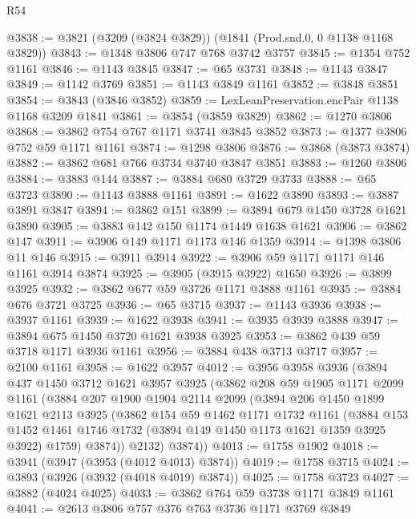\begin{lexlean}{R54}
\begin{coremodule}
@3838 := @3821 (@3209 (@3824 @3829)) (@1841 (Prod.snd.{0, 0} @1138 @1168 @3829))
@3843 := @1348 @3806 @747 @768 @3742 @3757
@3845 := @1354 @752 @1161
@3846 := @1143 @3845
@3847 := @65 @3731
@3848 := @1143 @3847
@3849 := @1142 @3769
@3851 := @1143 @3849 @1161
@3852 := @3848 @3851
@3854 := @3843 (@3846 @3852)
@3859 := LexLeanPreservation.encPair @1138 @1168 @3209 @1841
@3861 := @3854 (@3859 @3829)
@3862 := @1270 @3806
@3868 := @3862 @754 @767 @1171 @3741 @3845 @3852
@3873 := @1377 @3806 @752 @59 @1171 @1161
@3874 := @1298 @3806
@3876 := @3868 (@3873 @3874)
@3882 := @3862 @681 @766 @3734 @3740 @3847 @3851
@3883 := @1260 @3806
@3884 := @3883 @144
@3887 := @3884 @680 @3729 @3733
@3888 := @65 @3723
@3890 := @1143 @3888 @1161
@3891 := @1622 @3890
@3893 := @3887 @3891 @3847
@3894 := @3862 @151
@3899 := @3894 @679 @1450 @3728 @1621 @3890
@3905 := @3883 @142 @150 @1174 @1449 @1638 @1621
@3906 := @3862 @147
@3911 := @3906 @149 @1171 @1173 @146 @1359
@3914 := @1398 @3806 @11 @146
@3915 := @3911 @3914
@3922 := @3906 @59 @1171 @1171 @146 @1161 @3914 @3874
@3925 := @3905 (@3915 @3922) @1650
@3926 := @3899 @3925
@3932 := @3862 @677 @59 @3726 @1171 @3888 @1161
@3935 := @3884 @676 @3721 @3725
@3936 := @65 @3715
@3937 := @1143 @3936
@3938 := @3937 @1161
@3939 := @1622 @3938
@3941 := @3935 @3939 @3888
@3947 := @3894 @675 @1450 @3720 @1621 @3938 @3925
@3953 := @3862 @439 @59 @3718 @1171 @3936 @1161
@3956 := @3884 @438 @3713 @3717
@3957 := @2100 @1161
@3958 := @1622 @3957
@4012 := @3956
    @3958
    @3936
    (@3894
      @437
      @1450
      @3712
      @1621
      @3957
      @3925
      (@3862
        @208
        @59
        @1905
        @1171
        @2099
        @1161
        (@3884
          @207
          @1900
          @1904
          @2114
          @2099
          (@3894
            @206
            @1450
            @1899
            @1621
            @2113
            @3925
            (@3862
              @154
              @59
              @1462
              @1171
              @1732
              @1161
              (@3884
                @153
                @1452
                @1461
                @1746
                @1732
                (@3894 @149 @1450 @1173 @1621 @1359 @3925 @3922)
                @1759)
              @3874))
          @2132)
        @3874))
@4013 := @1758 @1902
@4018 := @3941 (@3947 (@3953 (@4012 @4013) @3874))
@4019 := @1758 @3715
@4024 := @3893 (@3926 (@3932 (@4018 @4019) @3874))
@4025 := @1758 @3723
@4027 := @3882 (@4024 @4025)
@4033 := @3862 @764 @59 @3738 @1171 @3849 @1161
@4041 := @2613 @3806 @757 @376 @763 @3736 @1171 @3769 @3849

\end{coremodule}
\end{lexlean}
